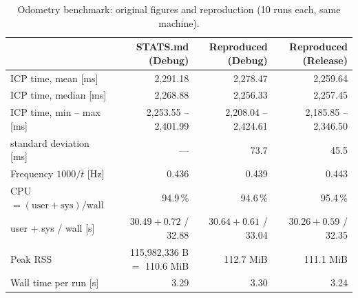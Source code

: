 \documentclass[10pt,a4paper]{scrartcl}
\begin{document}
  \begin{table}[H]
  \small
  \centering
  \renewcommand{\arraystretch}{1.05}
  \begin{tabular}{@{}lrrr@{}}
  \toprule
  & \textbf{STATS.md (Debug)} & \textbf{Reproduced (Debug)} & \textbf{Reproduced (Release)} \\
  \midrule
  ICP time, mean [ms]        & 2,291.18 & 2,278.47 & 2,259.64 \\
  ICP time, median [ms]      & 2,268.88 & 2,256.33 & 2,257.45 \\
  ICP time, min -- max [ms]  & 2,253.55 -- 2,401.99 & 2,208.04 -- 2,424.61 & 2,185.85 -- 2,346.50 \\
  standard deviation [ms]    & --- & 73.7 & 45.5 \\
  Frequency $1000/\bar t$ [Hz] & 0.436 & 0.439 & 0.443 \\
  CPU $=(\text{user}+\text{sys})/\text{wall}$ & 94.9\,\% & 94.6\,\% & 95.4\,\% \\
  \quad user + sys / wall [s] & $30.49+0.72$ / 32.88 & $30.64+0.61$ / 33.04 & $30.26+0.59$ / 32.35 \\
  Peak RSS                   & 115,982,336 B $=$ 110.6 MiB & 112.7 MiB & 111.1 MiB \\
  Wall time per run [s]      & 3.29 & 3.30 & 3.24 \\
  \bottomrule
  \end{tabular}
  \caption{Odometry benchmark: original figures and reproduction (10 runs each, same machine).}
  \label{tab:bench}
  \end{table}
\end{document}
